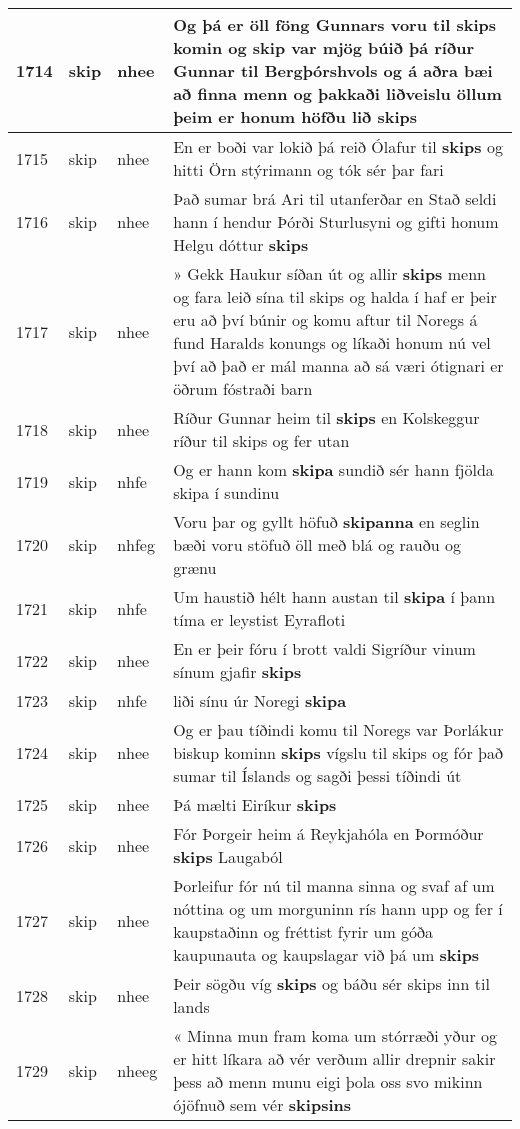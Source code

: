 \documentclass{article}
\begin{document}
\begin{longtable}{p{1cm}|p{1cm}|p{1cm}|p{13cm}}
\hline
1714&skip&nhee&Og þá er öll föng Gunnars voru til skips komin og skip var mjög búið þá ríður Gunnar til Bergþórshvols og á aðra bæi að finna menn og þakkaði liðveislu öllum þeim er honum höfðu lið \textbf{skips} \\
\hline
1715&skip&nhee&En er boði var lokið þá reið Ólafur til \textbf{skips} og hitti Örn stýrimann og tók sér þar fari\\
\hline
1716&skip&nhee&Það sumar brá Ari til utanferðar en Stað seldi hann í hendur Þórði Sturlusyni og gifti honum Helgu dóttur \textbf{skips} \\
\hline
1717&skip&nhee&» Gekk Haukur síðan út og allir \textbf{skips} menn og fara leið sína til skips og halda í haf er þeir eru að því búnir og komu aftur til Noregs á fund Haralds konungs og líkaði honum nú vel því að það er mál manna að sá væri ótignari er öðrum fóstraði barn\\
\hline
1718&skip&nhee&Ríður Gunnar heim til \textbf{skips} en Kolskeggur ríður til skips og fer utan\\
\hline
1719&skip&nhfe&Og er hann kom \textbf{skipa} sundið sér hann fjölda skipa í sundinu\\
\hline
1720&skip&nhfeg&Voru þar og gyllt höfuð \textbf{skipanna} en seglin bæði voru stöfuð öll með blá og rauðu og grænu\\
\hline
1721&skip&nhfe&Um haustið hélt hann austan til \textbf{skipa} í þann tíma er leystist Eyrafloti\\
\hline
1722&skip&nhee&En er þeir fóru í brott valdi Sigríður vinum sínum gjafir \textbf{skips} \\
\hline
1723&skip&nhfe&liði sínu úr Noregi \textbf{skipa} \\
\hline
1724&skip&nhee&Og er þau tíðindi komu til Noregs var Þorlákur biskup kominn \textbf{skips} vígslu til skips og fór það sumar til Íslands og sagði þessi tíðindi út\\
\hline
1725&skip&nhee&Þá mælti Eiríkur \textbf{skips} \\
\hline
1726&skip&nhee&Fór Þorgeir heim á Reykjahóla en Þormóður \textbf{skips} Laugaból\\
\hline
1727&skip&nhee&Þorleifur fór nú til manna sinna og svaf af um nóttina og um morguninn rís hann upp og fer í kaupstaðinn og fréttist fyrir um góða kaupunauta og kaupslagar við þá um \textbf{skips} \\
\hline
1728&skip&nhee&Þeir sögðu víg \textbf{skips} og báðu sér skips inn til lands\\
\hline
1729&skip&nheeg&« Minna mun fram koma um stórræði yður og er hitt líkara að vér verðum allir drepnir sakir þess að menn munu eigi þola oss svo mikinn ójöfnuð sem vér \textbf{skipsins} \\

\end{longtable}
\end{document}
